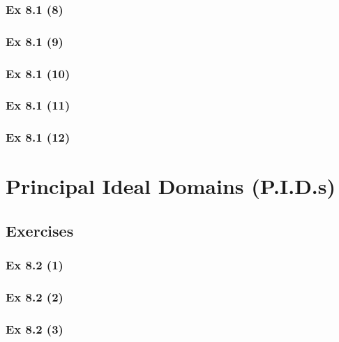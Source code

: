 \subsubsection{Ex 8.1 (8)}\label{sec:Ex_8.1.8}

\subsubsection{Ex 8.1 (9)}\label{sec:Ex_8.1.9}

\subsubsection{Ex 8.1 (10)}\label{sec:Ex_8.1.10}

\newpage		%

\subsubsection{Ex 8.1 (11)}\label{sec:Ex_8.1.11}

\subsubsection{Ex 8.1 (12)}\label{sec:Ex_8.1.12}

\newpage		%

\section{Principal Ideal Domains (P.I.D.s)}\label{sec:8.2}	
\subsection*{Exercises}\label{sec:8.2_Exercises}

\subsubsection{Ex 8.2 (1)}\label{sec:Ex_8.2.1}

\subsubsection{Ex 8.2 (2)}\label{sec:Ex_8.2.2}

\subsubsection{Ex 8.2 (3)}\label{sec:Ex_8.2.3}

